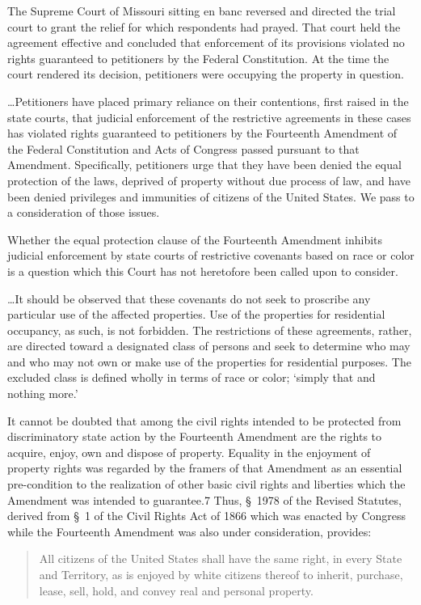 The Supreme Court of Missouri sitting en banc reversed and directed the trial
court to grant the relief for which respondents had prayed. That court held the
agreement effective and concluded that enforcement of its provisions violated no
rights guaranteed to petitioners by the Federal Constitution. At the time the
court rendered its decision, petitioners were occupying the property in
question.

\ldots Petitioners have placed primary reliance on their contentions, first
raised in the state courts, that judicial enforcement of the restrictive
agreements in these cases has violated rights guaranteed to petitioners by the
Fourteenth Amendment of the Federal Constitution and Acts of Congress passed
pursuant to that Amendment. Specifically, petitioners urge that they have been
denied the equal protection of the laws, deprived of property without due
process of law, and have been denied privileges and immunities of citizens of
the United States. We pass to a consideration of those issues.


Whether the equal protection clause of the Fourteenth Amendment inhibits
judicial enforcement by state courts of restrictive covenants based on race or
color is a question which this Court has not heretofore been called upon to
consider.

\ldots It should be observed that these covenants do not seek to proscribe any
particular use of the affected properties. Use of the properties for residential
occupancy, as such, is not forbidden. The restrictions of these agreements,
rather, are directed toward a designated class of persons and seek to determine
who may and who may not own or make use of the properties for residential
purposes. The excluded class is defined wholly in terms of race or color;
`simply that and nothing more.'

It cannot be doubted that among the civil rights intended to be protected from
discriminatory state action by the Fourteenth Amendment are the rights to
acquire, enjoy, own and dispose of property. Equality in the enjoyment of
property rights was regarded by the framers of that Amendment as an essential
pre-condition to the realization of other basic civil rights and liberties which
the Amendment was intended to guarantee.7 Thus, \S~1978 of the Revised Statutes,
derived from \S~1 of the Civil Rights Act of 1866 which was enacted by Congress
while the Fourteenth Amendment was also under consideration, provides:
\begin{quote}
All citizens of the United States shall have the same right, in every State
and Territory, as is enjoyed by white citizens thereof to inherit, purchase,
lease, sell, hold, and convey real and personal property.
\end{quote}

